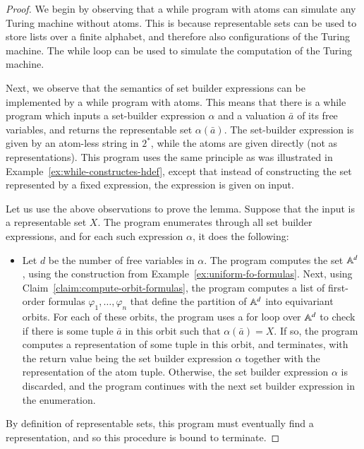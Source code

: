 \begin{proof}
	We begin by observing that a while program with atoms can simulate any Turing machine without atoms.  This is because representable sets can be used to store lists over a finite alphabet, and therefore also configurations of the Turing machine. The  while loop can be used to simulate the computation of the  Turing machine. 

	Next, we observe  that the semantics of set builder expressions can be implemented by a while program with atoms. This means that there is a while program which inputs a set-builder expression $\alpha$  and a valuation $\bar a$ of its free variables, and returns the representable set $\alpha(\bar a)$. The set-builder expression is given by an atom-less string in $2^*$, while the atoms are given directly (not as representations). This program uses the same principle as was illustrated in Example~\ref{ex:while-constructes-hdef}, except that instead of constructing the set represented by a fixed expression, the expression is given on input. 

	Let us use the above observations to prove the lemma. Suppose that the input is  a representable set $X$. The program enumerates through all set builder expressions, and for each such expression $\alpha$, it does the following:
	\begin{itemize}
		\item Let $d$ be the number of free variables in $\alpha$.  The program computes the set $\mathbb A^d$, using the construction from Example~\ref{ex:uniform-fo-formulas}. Next, using Claim~\ref{claim:compute-orbit-formulas}, the program computes a list of  first-order formulas $\varphi_1,\ldots,\varphi_n$ that define the partition of $\mathbb A^d$ into  equivariant orbits.  For each of these orbits, the program  uses a for loop over $\mathbb A^d$ to  check if there is some tuple $\bar a$ in this orbit  such that $\alpha(\bar a) = X$. If so, the program computes a representation of some tuple in this orbit, and terminates, with the return value being   the set builder expression $\alpha$ together with the representation of the atom tuple.  Otherwise, the set builder expression  $\alpha$ is discarded, and the program continues  with the next set builder expression  in the enumeration.
	\end{itemize}
	By definition of representable sets, this program must eventually find a representation, and so  this procedure is bound to terminate. 
\end{proof}

